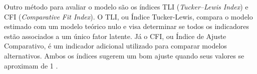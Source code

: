 Outro método para avaliar o modelo são os índices TLI (\textit{Tucker–Lewis Index}) e CFI (\textit{Comparative Fit Index}). O TLI, ou Índice Tucker-Lewis, compara o modelo estimado com um modelo teórico nulo e visa determinar se todos os indicadores estão associados a um único fator latente. Já o CFI, ou Índice de Ajuste Comparativo, é um indicador adicional utilizado para comparar modelos alternativos. Ambos os índices sugerem um bom ajuste quando seus valores se aproximam de 1 \cite{hair2009multivariada}.


\begin{comment}

\citeonline{timothy2015} considera o ajuste adequado quando o RMSEA é menor que 0,05. Quanto ao CFI e TLI, os onde valores acima de 0,90 sugerem um ajuste aceitável, e valores acima de 0,95 são considerados indicativos de um excelente ajuste.


---------------------------

Para verificar a adequação do melhor modelo, TLI e CFI são dois índices de ajuste usados na teoria de resposta ao item para avaliar o ajuste do modelo aos dados \cite{alvarenga2020item}.

 TLI significa Índice Tucker-Lewis e CFI significa Índice de Ajuste Comparativo. Esses índices de ajuste fornecem informações sobre o quão bem o modelo se ajusta às respostas dos itens observados. O TLI compara o ajuste do modelo especificado com um modelo nulo, enquanto o CFI compara o ajuste do modelo especificado com um modelo de linha de base. Valores mais altos de TLI e CFI indicam melhor ajuste entre o modelo e os dados. Esses índices de ajuste são aplicados no IRT para avaliar a adequação do modelo em representar a relação entre a característica latente e as respostas dos itens observados. 


RMSEA: O índice de raiz quadrada média do erro de aproximação (RMSEA) é um índice de ajuste absoluto que mede a discrepância média entre o modelo especificado e os dados observados. O valor do RMSEA varia de 0 a 1, e valores abaixo de 0,05 indicam um bom ajuste do modelo. Valores entre 0,05 e 0,08 indicam um ajuste razoável, enquanto valores acima de 0,10 indicam um ajuste pobre. O RMSEA é calculado como a diferença entre a discrepância média observada e a discrepância média esperada, dividida pelo número de graus de liberdade do modelo.

SRMR: O Índice Raiz Quadrada Média Residual Padronizada (SRMR) é uma medida de ajuste global que avalia a diferença entre as correlações observadas e as correlações estimadas pelo modelo. Em outras palavras, ele mede a discrepância entre as correlações amostrais e as correlações que o modelo estima. É uma medida padronizada, o que significa que ele é independente da escala de medida das variáveis do modelo. Ele é calculado dividindo o erro médio quadrático (EMQ) pelo erro médio quadrático residual (EMQr), que é a diferença entre o EMQ e o EMQ dos resíduos. O valor do SRMR varia de 0 a 1, sendo que valores menores indicam um melhor ajuste do modelo. Uma regra geral é que um valor de SRMR menor que 0,08 indica um bom ajuste do modelo, enquanto valores acima de 0,1 indicam um ajuste pobre. Valores entre 0,08 e 0,1 indicam um ajuste razoável.


\end{comment}
